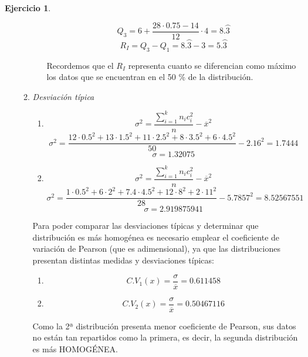 \documentclass[a4paper, 12pt]{article}
\theoremstyle{definition}
\newtheorem{ej}{Ejercicio}
\begin{document}
\begin{ej}
\begin{enumerate}[label=\textit{\alph*)}]
\begin{enumerate}[label=\arabic*)]
\begin{enumerate}[label=(\arabic*)]
    \[
    Q_3 = 6 + \frac{28 \cdot 0.75 - 14}{12} \cdot 4 = 8.\wideparen{3}
    \]
    \[
    R_I = Q_3 - Q_1 = 8.\wideparen{3} - 3 = 5.\wideparen{3}
    \]
    
    Recordemos que el \(R_I\) representa cuanto se diferencian como máximo los datos que se encuentran en el 50 \% de la distribución.
    \end{enumerate}
    
    \item \textit{Desviación típica}
    
    \begin{enumerate}[label=(\arabic*)]
        \item 
        \[
            \sigma^2 = \frac{\sum_{i=1}^{k}n_ic_i^2}{n} - \overline{x}^2  
        \]
        \[
        \sigma^2 = \frac{12 \cdot 0.5^2 + 13 \cdot 1.5^2 + 11 \cdot 2.5^2 + 8 \cdot 3.5^2 + 6 \cdot 4.5^2}{50} - 2.16^2 = 1.7444
        \]
        \[
        \sigma = 1.32075
        \]
        
        \item
        \[
            \sigma^2 = \frac{\sum_{i=1}^{k}n_ic_i^2}{n} - \overline{x}^2  
        \]
        \[
        \sigma^2 = \frac{1 \cdot 0.5^2 + 6 \cdot 2^2 + 7.4 \cdot 4.5^2 + 12 \cdot 8^2 + 2 \cdot 11^2}{28} - 5.7857^2 = 8.52567551
        \]
        \[
        \sigma = 2.919875941
        \]
    \end{enumerate}
    
    Para poder comparar las desviaciones típicas y determinar que distribución es más homogénea es necesario emplear el coeficiente de variación de Pearson (que es adimensional), ya que las distribuciones presentan distintas medidas y desviaciones típicas:
    \begin{enumerate}[label=(\arabic*)]
        \item 
        \[
        C.V_1(x) = \frac{\sigma}{\overline{x}} = 0.611458
        \]
        \item
        \[
        C.V_2(x) = \frac{\sigma}{\overline{x}} = 0.50467116
        \]
    \end{enumerate}
    
         Como la 2ª distribución presenta menor coeficiente de Pearson, sus datos no están tan repartidos como la primera, es decir, la segunda distribución es más HOMOGÉNEA.
     \end{enumerate}
    
\end{enumerate}
\end{ej}
\end{document}
